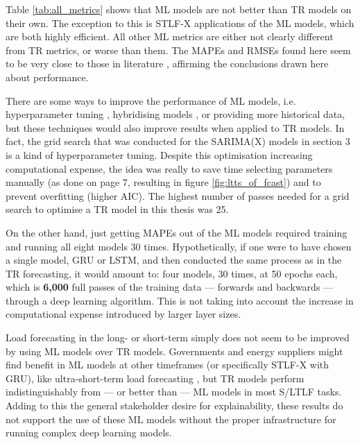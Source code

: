 \documentclass[12pt]{scrreprt}
\begin{document}
Table \ref{tab:all_metrics} shows that ML models are not better than TR models on their own. The exception to this is STLF-X applications of the ML models, which are both highly efficient. All other ML metrics are either not clearly different from TR metrics, or worse than them. The MAPEs and RMSEs found here seem to be very close to those in literature \cite{Nti20, Gao23, Chung22}, affirming the conclusions drawn here about performance. 

There are some ways to improve the performance of ML models, i.e. hyperparameter tuning \cite{Gao23}, hybridising models \cite{Chung22}, or providing more historical data, but these techniques would also improve results when applied to TR models. In fact, the grid search that was conducted for the SARIMA(X) models in section 3 is a kind of hyperparameter tuning. Despite this optimisation increasing computational expense, the idea was really to save time selecting parameters manually (as done on page 7, resulting in figure \ref{fig:ltts_of_fcast}) and to prevent overfitting (higher AIC). The highest number of passes needed for a grid search to optimise a TR model in this thesis was 25.

On the other hand, just getting MAPEs out of the ML models required training and running all eight models 30 times. Hypothetically, if one were to have chosen a single model, GRU or LSTM, and then conducted the same process as in the TR forecasting, it would amount to: four models, 30 times, at 50 epochs each, which is \textbf{6,000} full passes of the training data --- forwards and backwards --- through a deep learning algorithm. This is not taking into account the increase in computational expense introduced by larger layer sizes.

Load forecasting in the long- or short-term simply does not seem to be improved by using ML models over TR models. Governments and energy suppliers might find benefit in ML models at other timeframes (or specifically STLF-X with GRU), like ultra-short-term load forecasting \cite{Gao23}, but TR models perform indistinguishably from --- or better than --- ML models in most S/LTLF tasks. Adding to this the general stakeholder desire for explainability, these results do not support the use of these ML models without the proper infrastructure for running complex deep learning models.



\end{document}
